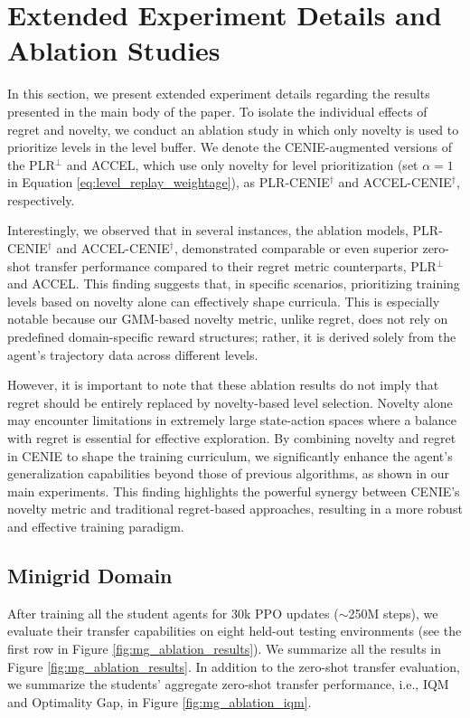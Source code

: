 \section{Extended Experiment Details and Ablation Studies} \label{section:ablation_studies}
In this section, we present extended experiment details regarding the results presented in the main body of the paper. To isolate the individual effects of regret and novelty, we conduct an ablation study in which only novelty is used to prioritize levels in the level buffer. We denote the CENIE-augmented versions of the PLR$^\perp$ and ACCEL, which use only novelty for level prioritization (set $\alpha=1$ in Equation \ref{eq:level_replay_weightage}), as PLR-CENIE$^\dag$ and ACCEL-CENIE$^\dag$, respectively.

Interestingly, we observed that in several instances, the ablation models, PLR-CENIE$^\dag$ and ACCEL-CENIE$^\dag$, demonstrated comparable or even superior zero-shot transfer performance compared to their regret metric counterparts, PLR$^\perp$ and ACCEL. This finding suggests that, in specific scenarios, prioritizing training levels based on novelty alone can effectively shape curricula. This is especially notable because our GMM-based novelty metric, unlike regret, does not rely on predefined domain-specific reward structures; rather, it is derived solely from the agent’s trajectory data across different levels. 

However, it is important to note that these ablation results do not imply that regret should be entirely replaced by novelty-based level selection. Novelty alone may encounter limitations in extremely large state-action spaces where a balance with regret is essential for effective exploration. By combining novelty and regret in CENIE to shape the training curriculum, we significantly enhance the agent’s generalization capabilities beyond those of previous algorithms, as shown in our main experiments. This finding highlights the powerful synergy between CENIE’s novelty metric and traditional regret-based approaches, resulting in a more robust and effective training paradigm.


\subsection{Minigrid Domain}
After training all the student agents for 30k PPO updates ($\sim$250M steps), we evaluate their transfer capabilities on eight held-out testing environments (see the first row in Figure \ref{fig:mg_ablation_results}). We summarize all the results in Figure \ref{fig:mg_ablation_results}. In addition to the zero-shot transfer evaluation, we summarize the students' aggregate zero-shot transfer performance, i.e., IQM and Optimality Gap, in Figure \ref{fig:mg_ablation_iqm}.

